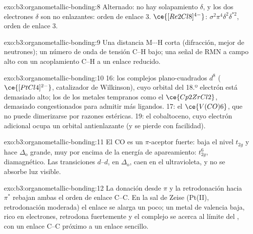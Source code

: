 \begin{solution}{exo:b3:organometallic-bonding:8}
Alternado: no hay solapamiento $\delta$, y los dos electrones $\delta$ son no enlazantes: orden de enlace 3. $\ce{[Re2Cl8]^{4-}}$:
$\sigma^2\pi^4\delta^2\delta^{\ast2}$, orden de enlace 3.
\end{solution}

\begin{solution}{exo:b3:organometallic-bonding:9}
Una distancia M$\cdots$H corta (difracción, mejor de neutrones); un número de onda de tensión C--H
bajo; una señal de RMN a campo alto con un acoplamiento C--H a un enlace reducido.
\end{solution}

\begin{solution}{exo:b3:organometallic-bonding:10}
16: los complejos plano-cuadrados $d^8$ ($\ce{[PtCl4]^{2-}}$, catalizador de Wilkinson), cuyo orbital del 18.º electrón
está demasiado alto; los  de los metales tempranos como el $\ce{Cp2ZrCl2}$, demasiado congestionados para admitir más
ligandos. 17: el $\ce{V(CO)6}$, que no puede dimerizarse por razones estéricas. 19: el cobaltoceno,
cuyo electrón adicional ocupa un orbital antienlazante (y se pierde con facilidad).
\end{solution}

\begin{solution}{exo:b3:organometallic-bonding:11}
El CO es un $\pi$-aceptor fuerte: baja el nivel $t_{2g}$ y hace $\Delta_{\mathrm o}$ grande, muy por encima de la
energía de apareamiento: $t_{2g}^6$, diamagnético. Las transiciones $d$--$d$, en $\Delta_{\mathrm o}$, caen en el ultravioleta,
y no se absorbe luz visible.
\end{solution}

\begin{solution}{exo:b3:organometallic-bonding:12}
La donación desde $\pi$ y la retrodonación hacia $\pi^*$ rebajan ambas el orden de enlace C--C. En la sal de
Zeise (Pt(II), retrodonación moderada) el enlace se alarga un poco; un metal de valencia baja,
rico en electrones, retrodona fuertemente y el complejo se acerca al límite del
, con un enlace C--C próximo a un enlace sencillo.
\end{solution}

